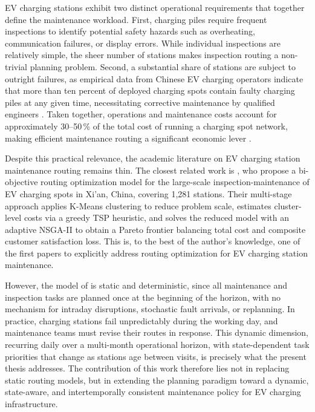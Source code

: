 \documentclass[12pt,oneside]{article}
\begin{document}
EV charging stations exhibit two distinct operational requirements that together define the maintenance workload. First, charging piles require frequent inspections to identify potential safety hazards such as overheating, communication failures, or display errors. While individual inspections are relatively simple, the sheer number of stations makes inspection routing a non-trivial planning problem. Second, a substantial share of stations are subject to outright failures, as empirical data from Chinese EV charging operators indicate that more than ten percent of deployed charging spots contain faulty charging piles at any given time, necessitating corrective maintenance by qualified engineers \citep{zhang2024routing}. Taken together, operations and maintenance costs account for approximately 30–50\,\% of the total cost of running a charging spot network, making efficient maintenance routing a significant economic lever \citep{zhang2024routing}.

Despite this practical relevance, the academic literature on EV charging station maintenance routing remains thin. The closest related work is \citet{zhang2024routing}, who propose a bi-objective routing optimization model for the large-scale inspection-maintenance of EV charging spots in Xi'an, China, covering 1{,}281 stations. Their multi-stage approach applies K-Means clustering to reduce problem scale, estimates cluster-level costs via a greedy TSP heuristic, and solves the reduced model with an adaptive NSGA-II to obtain a Pareto frontier balancing total cost and composite customer satisfaction loss. This is, to the best of the author's knowledge, one of the first papers to explicitly address routing optimization for EV charging station maintenance.

However, the model of \citet{zhang2024routing} is static and deterministic, since all maintenance and inspection tasks are planned once at the beginning of the horizon, with no mechanism for intraday disruptions, stochastic fault arrivals, or replanning. In practice, charging stations fail unpredictably during the working day, and maintenance teams must revise their routes in response. This dynamic dimension, recurring daily over a multi-month operational horizon, with state-dependent task priorities that change as stations age between visits, is precisely what the present thesis addresses. The contribution of this work therefore lies not in replacing static routing models, but in extending the planning paradigm toward a dynamic, state-aware, and intertemporally consistent maintenance policy for EV charging infrastructure.
\end{document}
